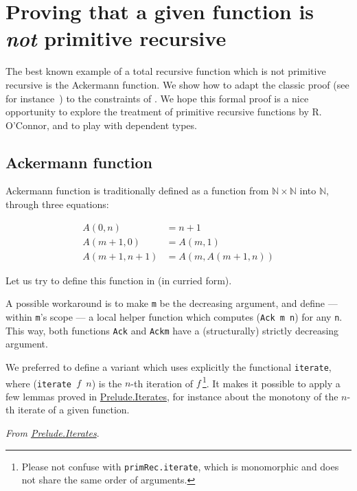 \section{Proving that a given function is \emph{not} primitive recursive}
\label{sect:ack-not-PR}

The best known example of a total recursive function which is not primitive recursive is the Ackermann function. We show how to adapt the classic proof (see for instance~\cite{planetmath}) to the constraints of \gallina. We hope this formal proof 
 is a nice opportunity to explore
the treatment of primitive recursive functions by R. O'Connor,
and to play with dependent types.

\subsection{Ackermann function}

Ackermann function is traditionally defined as a function from 
$\mathbb{N}\times \mathbb{N}$ into $\mathbb{N}$, through
three equations:

\begin{align}
A(0,n)&=n+1\\
A(m+1,0)&=A(m,1)\\
A(m+1,n+1)&=A(m,A(m+1,n))
\end{align}

Let us try to define this function in \coq{} (in curried form).



A possible workaround is to make \texttt{m} be the 
decreasing argument, and define --- within \texttt{m}'s scope --- a local helper function which computes (\texttt{Ack m n}) for any \texttt{n}.
This way, both functions \texttt{Ack} and \texttt{Ackm} have a (structurally) strictly decreasing argument.



We preferred to define a variant which uses explicitly
 the functional \texttt{iterate},
where (\texttt{iterate\,$f$\,$n$})
is the $n$-th iteration of $f$\,\footnote{Please not confuse with \texttt{primRec.iterate}, which is monomorphic and does not share the same order of arguments.}. It makes it possible to apply a few lemmas proved in 
\href{../theories/html/hydras.Prelude.Iterates.html}{Prelude.Iterates}, for instance about the monotony of the $n$-th iterate of a given function. 


\vspace{4pt}
\noindent
\emph{From \href{../theories/html/hydras.Prelude.Iterates.html}{Prelude.Iterates}}.

